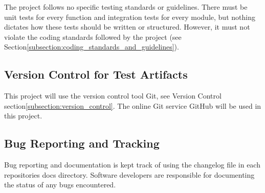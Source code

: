 The project follows no specific testing standards or guidelines. There must be unit tests for every function and integration tests for every module, but nothing dictates how these tests should be written or structured. However, it must not violate the coding standards followed by the project (see Section\:\ref{subsection:coding_standards_and_guidelines}).



\subsection{Version Control for Test Artifacts}

This project will use the version control tool Git, see Version Control section\:\ref{subsection:version_control}. The online Git service GitHub will be used in this project.



\subsection{Bug Reporting and Tracking}

Bug reporting and documentation is kept track of using the changelog file in each repositories docs directory. Software developers are responsible for documenting the status of any bugs encountered.



